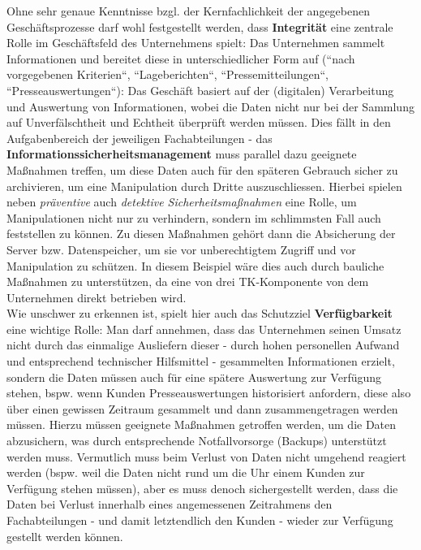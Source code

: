 Ohne sehr genaue Kenntnisse bzgl. der Kernfachlichkeit der angegebenen Geschäftsprozesse darf wohl festgestellt werden, dass \textbf{Integrität} eine zentrale Rolle im Geschäftsfeld des Unternehmens spielt: Das Unternehmen sammelt Informationen und bereitet diese in unterschiedlicher Form auf (``nach vorgegebenen Kriterien``, ``Lageberichten``, ``Pressemitteilungen``, ``Presseauswertungen``):
Das Geschäft basiert auf der (digitalen) Verarbeitung und Auswertung von Informationen, wobei die Daten nicht nur bei der Sammlung auf Unverfälschtheit und Echtheit überprüft werden müssen.
Dies fällt in den Aufgabenbereich der jeweiligen Fachabteilungen - das \textbf{Informationssicherheitsmanagement} muss parallel dazu geeignete Maßnahmen treffen, um diese Daten auch für den späteren Gebrauch sicher zu archivieren, um eine Manipulation durch Dritte auszuschliessen.
Hierbei spielen neben \textit{präventive} auch \textit{detektive Sicherheitsmaßnahmen} eine Rolle, um Manipulationen nicht nur zu verhindern, sondern im schlimmsten Fall auch feststellen zu können.
Zu diesen Maßnahmen gehört dann die Absicherung der Server bzw. Datenspeicher, um sie vor unberechtigtem Zugriff und vor Manipulation zu schützen.
In diesem Beispiel wäre dies auch durch  bauliche Maßnahmen  zu unterstützen, da eine von drei TK-Komponente von dem Unternehmen direkt betrieben wird.\\


Wie unschwer zu erkennen ist, spielt hier auch das Schutzziel \textbf{Verfügbarkeit} eine wichtige Rolle: Man darf annehmen, dass das Unternehmen seinen Umsatz nicht durch das einmalige Ausliefern dieser - durch hohen personellen Aufwand und entsprechend technischer Hilfsmittel - gesammelten Informationen erzielt, sondern die Daten müssen auch für eine spätere Auswertung zur Verfügung stehen, bspw. wenn Kunden Presseauswertungen historisiert anfordern, diese also über einen gewissen Zeitraum gesammelt und dann zusammengetragen werden müssen.
Hierzu müssen geeignete Maßnahmen getroffen werden, um die Daten abzusichern, was durch entsprechende Notfallvorsorge (Backups) unterstützt werden muss.
Vermutlich muss beim Verlust von Daten nicht umgehend reagiert werden (bspw. weil die Daten nicht rund um die Uhr einem Kunden zur Verfügung stehen müssen), aber es muss denoch sichergestellt werden, dass die Daten bei Verlust innerhalb eines angemessenen Zeitrahmens den Fachabteilungen - und damit letztendlich den Kunden - wieder zur Verfügung gestellt werden können.\\


